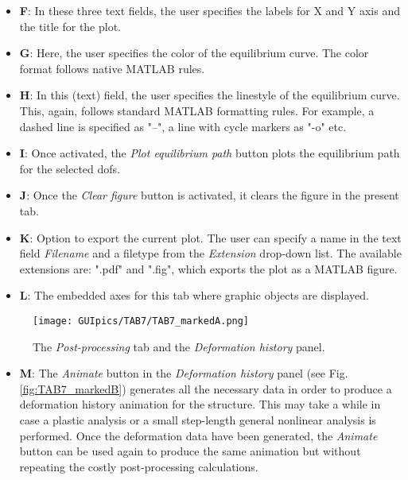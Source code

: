 \begin{appendices}
\begin{itemize}
	\item \textbf{F}: In these three text fields, the user specifies the labels 
	for X and Y axis and the title for the plot.
	
	\item \textbf{G}: Here, the user specifies the color of the equilibrium 
	curve. The color format follows native MATLAB rules.
	\item \textbf{H}: In this (text) field, the user specifies the linestyle of 
	the equilibrium curve. This, again, follows standard MATLAB formatting 
	rules. For example, a dashed line is specified as "--", a line with cycle 
	markers as "-o" etc.
	
	\item \textbf{I}: Once activated, the \textit{Plot equilibrium path} button 
	plots the equilibrium path for the selected \acrshort{dof}s.
	\item \textbf{J}: Once the \textit{Clear figure} button is activated, it 
	clears the figure in the present tab.
	\item \textbf{K}: Option to export the current plot. The user can specify a 
	name in the text field \textit{Filename} and a filetype from the 
	\textit{Extension} drop-down list. The available extensions are: ".pdf" and 
	".fig", which exports the plot as a MATLAB figure.
	\item \textbf{L}: The embedded axes for this tab where graphic objects are 
	displayed.
	
\end{itemize}

\begin{figure}
	\centering
	\texttt{[image: GUIpics/TAB7/TAB7\_markedA.png]}
	\caption{The \textit{Post-processing} tab and the \textit{Deformation 
			history} panel.}
	\label{fig:TAB7_markedA}
\end{figure}

\begin{itemize}
	\item \textbf{M}: The \textit{Animate} button in the \textit{Deformation 
		history} panel (see Fig. \ref{fig:TAB7_markedB}) generates all the 
	necessary data in order to produce a deformation history animation for the 
	structure. This may take a while in case a plastic analysis or a small 
	step-length general nonlinear analysis is performed. Once the deformation 
	data have been generated, the \textit{Animate} button can be used again to 
	produce the same animation but without repeating the costly post-processing 
	calculations.
	

\end{itemize}
\end{appendices}
